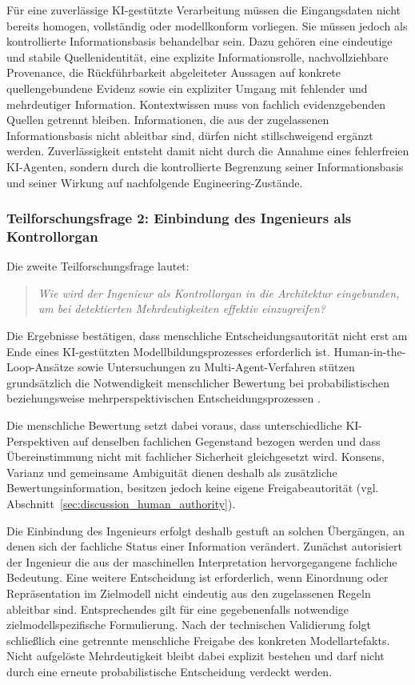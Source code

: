Für eine zuverlässige KI-gestützte Verarbeitung müssen die Eingangsdaten
nicht bereits homogen, vollständig oder modellkonform vorliegen. Sie müssen
jedoch als kontrollierte Informationsbasis behandelbar sein. Dazu gehören
eine eindeutige und stabile Quellenidentität, eine explizite
Informationsrolle, nachvollziehbare Provenance, die Rückführbarkeit
abgeleiteter Aussagen auf konkrete quellengebundene Evidenz sowie ein
expliziter Umgang mit fehlender und mehrdeutiger Information. Kontextwissen
muss von fachlich evidenzgebenden Quellen getrennt bleiben. Informationen,
die aus der zugelassenen Informationsbasis nicht ableitbar sind, dürfen nicht
stillschweigend ergänzt werden. Zuverlässigkeit entsteht damit nicht durch
die Annahme eines fehlerfreien KI-Agenten, sondern durch die kontrollierte
Begrenzung seiner Informationsbasis und seiner Wirkung auf nachfolgende
Engineering-Zustände.

\subsubsection{Teilforschungsfrage 2: Einbindung des Ingenieurs als Kontrollorgan}
\label{sec:discussion_rq2}

Die zweite Teilforschungsfrage lautet:

\begin{quote}
\textit{Wie wird der Ingenieur als Kontrollorgan in die Architektur eingebunden,
um bei detektierten Mehrdeutigkeiten effektiv einzugreifen?}
\end{quote}

Die Ergebnisse bestätigen, dass menschliche Entscheidungsautorität nicht erst
am Ende eines KI-gestützten Modellbildungsprozesses erforderlich ist.
Human-in-the-Loop-Ansätze sowie Untersuchungen zu Multi-Agent-Verfahren
stützen grundsätzlich die Notwendigkeit menschlicher Bewertung bei
probabilistischen beziehungsweise mehrperspektivischen
Entscheidungsprozessen
\cite{MosqueiraRey2023,Lazaros2026,TriemDing2024}.

Die menschliche Bewertung setzt dabei voraus, dass unterschiedliche
KI-Perspektiven auf denselben fachlichen Gegenstand bezogen werden und dass
Übereinstimmung nicht mit fachlicher Sicherheit gleichgesetzt wird. Konsens,
Varianz und gemeinsame Ambiguität dienen deshalb als zusätzliche
Bewertungsinformation, besitzen jedoch keine eigene Freigabeautorität
(vgl. Abschnitt~\ref{sec:discussion_human_authority}).

Die Einbindung des Ingenieurs erfolgt deshalb gestuft an solchen Übergängen,
an denen sich der fachliche Status einer Information verändert. Zunächst
autorisiert der Ingenieur die aus der maschinellen Interpretation
hervorgegangene fachliche Bedeutung. Eine weitere Entscheidung ist
erforderlich, wenn Einordnung oder Repräsentation im Zielmodell nicht
eindeutig aus den zugelassenen Regeln ableitbar sind. Entsprechendes gilt für
eine gegebenenfalls notwendige zielmodellspezifische Formulierung. Nach der
technischen Validierung folgt schließlich eine getrennte menschliche
Freigabe des konkreten Modellartefakts. Nicht aufgelöste Mehrdeutigkeit
bleibt dabei explizit bestehen und darf nicht durch eine erneute
probabilistische Entscheidung verdeckt werden.


